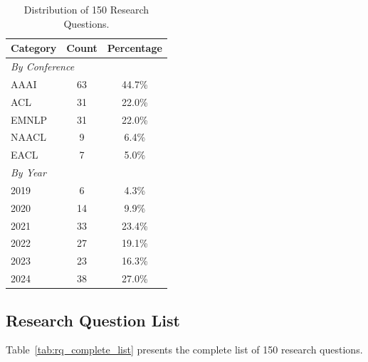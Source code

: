 \documentclass[runningheads]{llncs}
\begin{document}
\begin{table}[h]
\centering
\small
\caption{Distribution of 150 Research Questions.}
\label{tab:rq_statistics}
\begin{tabular}{lcc}
\toprule
\textbf{Category} & \textbf{Count} & \textbf{Percentage} \\
\midrule
\multicolumn{3}{l}{\textit{By Conference}} \\
AAAI & 63 & 44.7\% \\
ACL & 31 & 22.0\% \\
EMNLP & 31 & 22.0\% \\
NAACL & 9 & 6.4\% \\
EACL & 7 & 5.0\% \\
\midrule
\multicolumn{3}{l}{\textit{By Year}} \\
2019 & 6 & 4.3\% \\
2020 & 14 & 9.9\% \\
2021 & 33 & 23.4\% \\
2022 & 27 & 19.1\% \\
2023 & 23 & 16.3\% \\
2024 & 38 & 27.0\% \\
\bottomrule
\end{tabular}
\end{table}

\subsection{Research Question List}

Table~\ref{tab:rq_complete_list} presents the complete list of 150 research questions.
\end{document}
